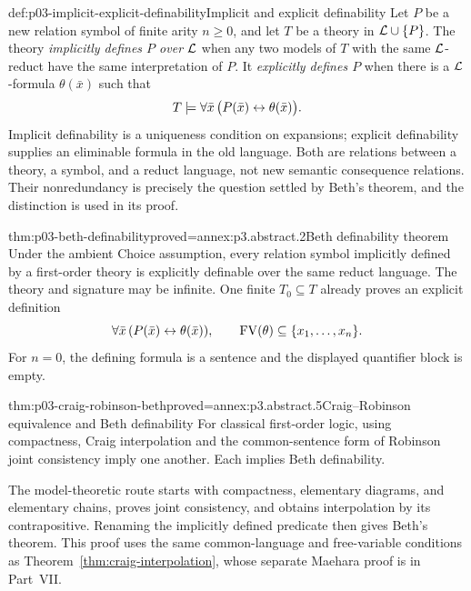 \begin{hbdefinition}{def:p03-implicit-explicit-definability}{Implicit and explicit definability}
Let \(P\) be a new relation symbol of finite arity \(n\geq0\), and let \(T\) be a theory in
\(\mathcal{L}\cup\{P\}\).  The theory \emph{implicitly defines \(P\) over
\(\mathcal{L}\)} when any two models of \(T\) with the same \(\mathcal{L}\)-reduct have
the same interpretation of \(P\).  It \emph{explicitly defines \(P\)} when
there is a \(\mathcal{L}\)-formula \(\theta(\bar x)\) such that
\[
 T\models\forall\bar x\,
   \bigl(P(\bar x)\leftrightarrow\theta(\bar x)\bigr).
\]
Implicit definability is a uniqueness condition on expansions; explicit
definability supplies an eliminable formula in the old language.  Both are
relations between a theory, a symbol, and a reduct language, not new semantic
consequence relations.  Their nonredundancy is precisely the question settled
by Beth's theorem, and the distinction is used in its proof.
\end{hbdefinition}

\begin{hbtheorem}{thm:p03-beth-definability}{proved=annex:p3.abstract.2}{Beth definability theorem}
Under the ambient Choice assumption, every relation symbol implicitly
defined by a first-order theory is explicitly definable over the same
reduct language.  The theory and signature may be infinite.
One finite \(T_0\subseteq T\) already proves an explicit definition
\[
 \forall\bar x\,
       (P(\bar x)\leftrightarrow\theta(\bar x)),
 \qquad \operatorname{FV}(\theta)\subseteq\{x_1,\ldots,x_n\}.
\]
For \(n=0\), the defining formula is a sentence and the displayed
quantifier block is empty.
\end{hbtheorem}

\begin{hbtheorem}{thm:p03-craig-robinson-beth}{proved=annex:p3.abstract.5}{Craig--Robinson equivalence and Beth definability}
For classical first-order logic, using compactness, Craig interpolation
and the common-sentence form of Robinson joint consistency imply one
another.  Each implies Beth definability.
\end{hbtheorem}

The model-theoretic route starts with compactness, elementary diagrams,
and elementary chains, proves joint consistency, and obtains interpolation
by its contrapositive.  Renaming the implicitly defined predicate then gives
Beth's theorem.  This proof uses the same common-language and free-variable
conditions as Theorem~\ref{thm:craig-interpolation}, whose separate
Maehara proof is in Part~VII.


